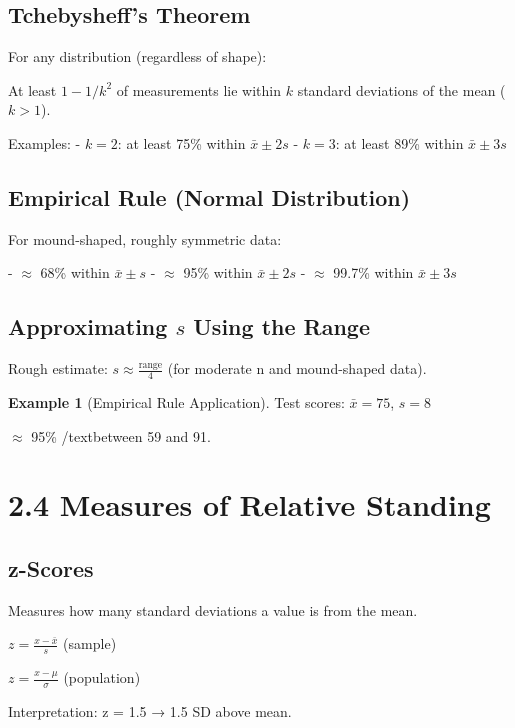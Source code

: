 \documentclass{article}
\theoremstyle{definition}
\newtheorem{example}{Example}
\begin{document}
	\subsection{Tchebysheff’s Theorem}
	
	For any distribution (regardless of shape):
	
	At least \(1 - 1/k^2\) of measurements lie within \(k\) standard deviations of the mean (\(k > 1\)).
	
	Examples:
	- \(k=2\): at least 75\% within \(\bar{x} \pm 2s\)
	- \(k=3\): at least 89\% within \(\bar{x} \pm 3s\)
	
	\subsection{Empirical Rule (Normal Distribution)}
	
	For mound-shaped, roughly symmetric data:
	
	- $\approx$ 68\% within \(\bar{x} \pm s\)
	- $\approx$ 95\% within \(\bar{x} \pm 2s\)
	- $\approx$ 99.7\% within \(\bar{x} \pm 3s\)
	
	\subsection{Approximating \(s\) Using the Range}
	
	Rough estimate: \(s \approx \frac{\text{range}}{4}\) (for moderate n and mound-shaped data).
	
	\begin{example}[Empirical Rule Application]
		Test scores: \(\bar{x} = 75\), \(s = 8\)
		
		$\approx$ 95\% /text{between} 59 and 91.
	\end{example}
	
	\section{2.4 Measures of Relative Standing}
	
	\subsection{z-Scores}
	
	Measures how many standard deviations a value is from the mean.
	
	\(z = \frac{x - \bar{x}}{s}\) (sample)
	
	\(z = \frac{x - \mu}{\sigma}\) (population)
	
	Interpretation: z = 1.5 → 1.5 SD above mean.
	
\end{document}
